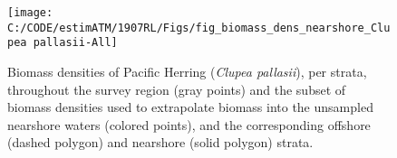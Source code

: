 \documentclass[]{article}
\begin{document}
\newpage



\begin{figure}[H]

{\centering \texttt{[image: C:/CODE/estimATM/1907RL/Figs/fig\_biomass\_dens\_nearshore\_Clupea pallasii-All]} 

}

\caption{Biomass densities of Pacific Herring (\emph{Clupea pallasii}), per strata, throughout the survey region (gray points) and the subset of biomass densities used to extrapolate biomass into the unsampled nearshore waters (colored points), and the corresponding offshore (dashed polygon) and nearshore (solid polygon) strata.}\label{fig:ns-biom-dens-her}
\end{figure}
\end{document}
